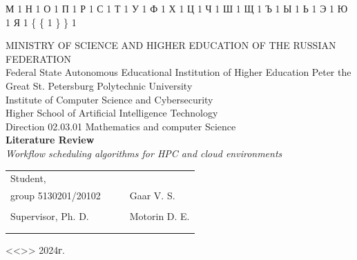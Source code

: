 \documentclass[a4paper, final]{article}
\begin{document}
{  {М}{ {\selectfont{}} }1
  {Н}{ {\selectfont{}} }1
  {О}{ {\selectfont{}} }1
  {П}{ {\selectfont{}} }1
  {Р}{ {\selectfont{}} }1
  {С}{ {\selectfont{}} }1
  {Т}{ {\selectfont{}} }1
  {У}{ {\selectfont{}} }1
  {Ф}{ {\selectfont{}} }1
  {Х}{ {\selectfont{}} }1
  {Ц}{ {\selectfont{}} }1
  {Ч}{ {\selectfont{}} }1
  {Ш}{ {\selectfont{}} }1
  {Щ}{ {\selectfont{}} }1
  {Ъ}{ {\selectfont{}} }1
  {Ы}{ {\selectfont{}} }1
  {Ь}{ {\selectfont{}} }1
  {Э}{ {\selectfont{}} }1
  {Ю}{ {\selectfont{}} }1
  {Я}{ {\selectfont{}} }1
  {\{}{ { {\color{brackets}\{} } }1 %
  {\} }{ { {\color{brackets}\} } } }1 %
}

\begin{center}
    \hfill \break
    \hfill \break
    \normalsize{MINISTRY OF SCIENCE AND HIGHER EDUCATION OF THE RUSSIAN FEDERATION\\
    Federal State Autonomous Educational Institution of Higher Education Peter the Great St. Petersburg Polytechnic University\\[10pt]}
    \normalsize{Institute of Computer Science and Cybersecurity}\\[10pt] 
    \normalsize{Higher School of Artificial Intelligence Technology}\\[10pt] 
    \normalsize{Direction 02.03.01 Mathematics and computer Science}\\
    
    \hfill \break
    \hfill \break
    \hfill \break
    \hfill \break
    \large{\textbf{Literature Review}}\\
    \large{\textit{Workflow scheduling algorithms for HPC and cloud environments}}\\
    
    \hfill \break
    \hfill \break
\end{center}

\small{ 
    \begin{tabular}{lrrl}
        \!\!\!Student, & \hspace{2cm} & & \\
        \!\!\!group 5130201/20102 & \hspace{2cm} & \underline{\hspace{3cm}} & Gaar V. S. \\\\
        \!\!\!Supervisor, Ph. D. & \hspace{2cm} &  \underline{\hspace{3cm}} &  Motorin D. E. \\\\
        &&\hspace{4cm}
    \end{tabular}
    \begin{flushright}
        <<\underline{\hspace{1cm}}>>\underline{\hspace{2.5cm}} 2024г.
    \end{flushright}
}
\end{document}
